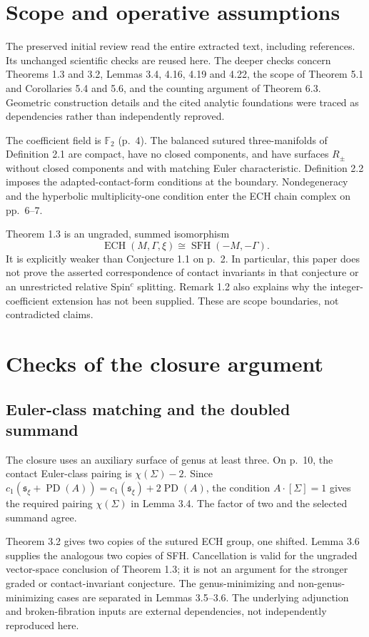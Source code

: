 \documentclass[10pt]{article}
\begin{document}
\section*{Scope and operative assumptions}
The preserved initial review read the entire extracted text, including references. Its unchanged scientific checks are reused here. The deeper checks concern Theorems 1.3 and 3.2, Lemmas 3.4, 4.16, 4.19 and 4.22, the scope of Theorem 5.1 and Corollaries 5.4 and 5.6, and the counting argument of Theorem 6.3. Geometric construction details and the cited analytic foundations were traced as dependencies rather than independently reproved.\par
The coefficient field is \(\mathbb F_2\) (p. 4). The balanced sutured three-manifolds of Definition 2.1 are compact, have no closed components, and have surfaces \(R_\pm\) without closed components and with matching Euler characteristic. Definition 2.2 imposes the adapted-contact-form conditions at the boundary. Nondegeneracy and the hyperbolic multiplicity-one condition enter the ECH chain complex on pp. 6–7.\par
Theorem 1.3 is an ungraded, summed isomorphism \[\operatorname{ECH}(M,\Gamma,\xi)\cong\operatorname{SFH}(-M,-\Gamma).\] It is explicitly weaker than Conjecture 1.1 on p. 2. In particular, this paper does not prove the asserted correspondence of contact invariants in that conjecture or an unrestricted relative Spin\(^c\) splitting. Remark 1.2 also explains why the integer-coefficient extension has not been supplied. These are scope boundaries, not contradicted claims.\par
\section*{Checks of the closure argument}
\subsection*{Euler-class matching and the doubled summand}
The closure uses an auxiliary surface of genus at least three. On p. 10, the contact Euler-class pairing is \(\chi(\Sigma)-2\). Since \(c_1(\mathfrak s_\xi+\operatorname{PD}(A))
=c_1(\mathfrak s_\xi)+2\operatorname{PD}(A)\), the condition \(A\cdot[\Sigma]=1\) gives the required pairing \(\chi(\Sigma)\) in Lemma 3.4. The factor of two and the selected summand agree.\par
Theorem 3.2 gives two copies of the sutured ECH group, one shifted. Lemma 3.6 supplies the analogous two copies of SFH. Cancellation is valid for the ungraded vector-space conclusion of Theorem 1.3; it is not an argument for the stronger graded or contact-invariant conjecture. The genus-minimizing and non-genus-minimizing cases are separated in Lemmas 3.5–3.6. The underlying adjunction and broken-fibration inputs are external dependencies, not independently reproduced here.\par
\end{document}
